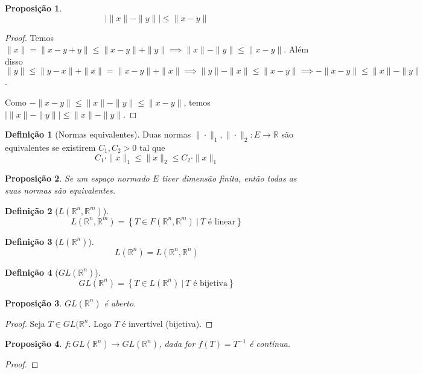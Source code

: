 \documentclass{article}
\theoremstyle{plain}
\newtheorem{prop}{Proposição}[section]
\theoremstyle{definition}
\newtheorem{definicao}{Definição}[section]
\theoremstyle{remark}
\begin{document}
\begin{prop}
	$$| \| x \| - \| y \| |  \leq  \|  x - y \| $$
\end{prop}
\begin{proof}
	Temos $\| x\| = \| x-y +y\| \leq \|x-y\| +\|y\| \implies \| x\| - \|y\| \leq \| x-y\|$. Além disso $\|y\| \leq \|y-x\| + \|x\| = \|x-y\| +\|x\| \implies \|y\| -\|x\| \leq \| x-y\| \implies -\|x-y\| \leq \|x\| - \|y\|$.

	Como $-\|x-y\| \leq \|x\| - \|y\| \leq \|x-y\|$, temos $| \|x\| - \|y\| | \leq \|x\| -\|y\|$.

\end{proof}
\begin{definicao}[Normas equivalentes]
	Duas normas $\|\cdot \|_1, \| \cdot \|_2 : E \to \mathbb{R}$ são equivalentes se existirem $C_1,C_2 > 0$ tal que $$ C_1 \cdot \|x\|_1 \leq \|x\|_2 \leq C_2\cdot \| x\|_1 $$
\end{definicao}
\begin{prop}
	Se um espaço normado $E$ tiver dimensão finita, então todas as suas normas são equivalentes.
\end{prop}
\begin{definicao}[$L(\mathbb{R}^n, \mathbb{R}^m)$]
	$$L(\mathbb{R}^n, \mathbb{R}^m) = \left\{ T \in F(\mathbb{R}^n, \mathbb{R}^m) \: | \: T \text{ é linear}\right\}$$
\end{definicao}
\begin{definicao}[$L(\mathbb{R}^n)$]
	$$L(\mathbb{R}^n) = L(\mathbb{R}^n, \mathbb{R}^n)$$
\end{definicao}
\begin{definicao}[$GL(\mathbb{R}^n)$]
	$$GL(\mathbb{R}^n) = \left\{ T \in L(\mathbb{R}^n) \: | \: T \text{ é bijetiva}\right\}$$
\end{definicao}
\begin{prop}
	$GL(\mathbb{R}^n)$ é aberto.
\end{prop}
\begin{proof}
	Seja $T\in GL(\mathbb{R}^n$. Logo $T$ é  invertível (bijetiva). 
\end{proof}
\begin{prop}
	$f:GL(\mathbb{R}^n) \to GL(\mathbb{R}^n)$, dada for $f(T) = T^{-1}$ é contínua.
\end{prop}
\begin{proof}
\end{proof}
\end{document}
